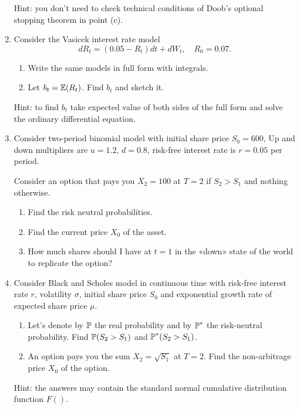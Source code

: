 \documentclass[12pt, a4paper]{article}
\begin{document}
\begin{enumerate}
  Hint: you don't need to check technical conditions of Doob's optional stopping theorem in point (c). 
  
  \item Consider the Vasicek interest rate model 
  \[
  dR_t = (0.05 - R_t) dt + dW_t, \quad R_0 = 0.07.    
  \]
  \begin{enumerate}
      \item Write the same models in full form with integrals. 
      \item Let $b_t = \E(R_t)$. Find $b_t$ and sketch it. 
  \end{enumerate}
  
  Hint: to find $b_t$ take expected value of both sides of the full form and solve the ordinary differential equation. 
  
      \item Consider two-period binomial model with initial share price $S_0 = 600$, 
      Up and down multipliers are $u=1.2$, $d=0.8$, risk-free interest rate is $r = 0.05$ per period. 
      
      Consider an option that pays you $X_2 = 100$ at $T=2$ if $S_2 > S_1$ and nothing otherwise. 
      
      \begin{enumerate}
          \item Find the risk neutral probabilities. 
          \item Find the current price $X_0$ of the asset. 
          \item How much shares should I have at $t=1$ in the «down» state of the world to replicate the option?
      \end{enumerate}
      
      
      \item  Consider Black and Scholes model in continuous time with risk-free interest rate $r$, 
      volatility $\sigma$, initial share price $S_0$ and exponential growth rate of expected share price $\mu$. 
  
      \begin{enumerate}
          \item Let's denote by $\P$ the real probability and by $\P^*$ the risk-neutral probability. 
          Find $\P(S_2 > S_1)$ and $\P^*(S_2 > S_1)$.
          \item An option pays you the sum $X_2 = \sqrt{S_1}$ at $T=2$. 
          Find the non-arbitrage price $X_0$ of the option. 
      \end{enumerate}
  
      Hint: the answers may contain the standard normal cumulative distribution function $F()$.
  
      
  
      
  \end{enumerate}
\end{document}
